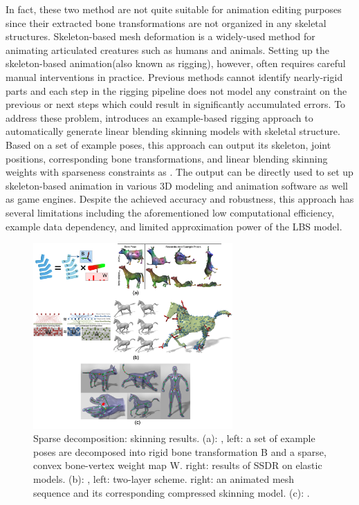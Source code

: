 In fact, these two method are not quite suitable for animation editing purposes since their extracted bone transformations are not organized in any skeletal structures. Skeleton-based mesh deformation is a widely-used method for animating articulated creatures such as humans and animals. Setting up the skeleton-based animation(also known as rigging), however, often requires careful manual interventions in practice. Previous methods cannot identify nearly-rigid parts and each step in the rigging pipeline does not model any constraint on the previous or next steps which could result in significantly accumulated errors. To address these problem, \cite{le2014ras} introduces an example-based rigging approach to automatically generate linear blending skinning models with skeletal structure. Based on a set of example poses, this approach can output its skeleton, joint positions, corresponding bone transformations, and linear blending skinning weights with sparseness constraints as \cite{le2012smooth}. The output can be directly used to set up skeleton-based animation in various 3D modeling and animation software as well as game engines. Despite the achieved accuracy and robustness, this approach has several limitations including the aforementioned low computational efficiency, example data dependency, and limited approximation power of the LBS model.


\begin{figure}[ht]
  \centering
  \includegraphics[width=3in]{images/skinning_decomposition}
  \caption{Sparse decomposition: skinning results. (a): \cite{le2012smooth}, left: a set of example poses are decomposed into rigid bone transformation B and a sparse, convex bone-vertex weight map W. right: results of SSDR on elastic models. (b): \cite{le2013two}, left: two-layer scheme. right: an animated mesh sequence and its corresponding compressed skinning model. (c): \cite{le2014ras}.}
\end{figure}


